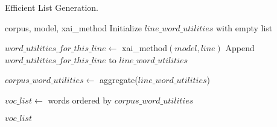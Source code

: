 \begin{algorithm}
\caption{Efficient List Generation.}
\label{alg:efficient-list-generation}
\begin{algorithmic}[1]
\Require corpus, model, xai\_method
\State Initialize $line\_word\_utilities$ with empty list

    \State $word\_utilities\_for\_this\_line \gets$ xai\_method$(model, line)$
    \State Append $word\_utilities\_for\_this\_line$ to $line\_word\_utilities$
\EndFor

\State $corpus\_word\_utilities \gets$ aggregate($line\_word\_utilities$)

\State $voc\_list \gets$ words ordered by $corpus\_word\_utilities$

\State \Return $voc\_list$
\end{algorithmic}
\end{algorithm}
